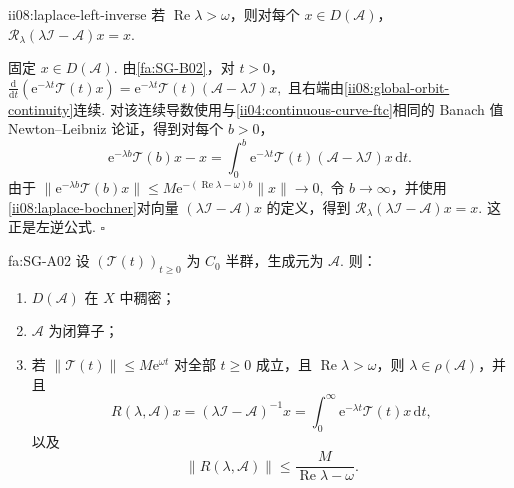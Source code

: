 \begin{FAProposition}{ii08:laplace-left-inverse}
若 \(\displaystyle\operatorname{Re}\lambda>\omega\)，则对每个 \(\displaystyle x\in D(\mathcal A)\)，
\(\displaystyle \mathcal R_\lambda(\lambda\mathcal I-\mathcal A)x=x.\)
\end{FAProposition}

\begin{FAProof}
固定 \(\displaystyle x\in D(\mathcal A)\). 由\autoref{fa:SG-B02}，对 \(\displaystyle t>0\)，
\(\displaystyle \frac{\mathrm{d}}{\mathrm{d}t} \left( \mathrm{e}^{-\lambda t}\mathcal T(t)x \right) = \mathrm{e}^{-\lambda t}\mathcal T(t)(\mathcal A-\lambda\mathcal I)x,\)
且右端由\autoref{ii08:global-orbit-continuity}连续. 对该连续导数使用与\autoref{ii04:continuous-curve-ftc}相同的 Banach 值 Newton--Leibniz 论证，得到对每个 \(\displaystyle b>0\)，
\[
\mathrm{e}^{-\lambda b}\mathcal T(b)x-x
=
\int_0^b
\mathrm{e}^{-\lambda t}\mathcal T(t)(\mathcal A-\lambda\mathcal I)x
\,\mathrm{d}t.
\]
由于
\(\displaystyle \|\mathrm{e}^{-\lambda b}\mathcal T(b)x\| \leqslant M\mathrm{e}^{-(\operatorname{Re}\lambda-\omega)b}\|x\| \longrightarrow0,\)
令 \(\displaystyle b\to\infty\)，并使用\autoref{ii08:laplace-bochner}对向量 \(\displaystyle(\lambda\mathcal I-\mathcal A)x\) 的定义，得到
\(\displaystyle \mathcal R_\lambda(\lambda\mathcal I-\mathcal A)x=x.\)
这正是左逆公式.
\hfill\(\square\)
\end{FAProof}

\begin{FATheorem}{fa:SG-A02}
设 \(\displaystyle(\mathcal T(t))_{t\geqslant0}\) 为 \(\displaystyle C_0\) 半群，生成元为 \(\displaystyle\mathcal A\). 则：
\begin{enumerate}[label=\textnormal{(\roman*)}]
\item \(\displaystyle D(\mathcal A)\) 在 \(\displaystyle X\) 中稠密；
\item \(\displaystyle\mathcal A\) 为闭算子；
\item 若 \(\displaystyle\|\mathcal T(t)\|\leqslant M\mathrm{e}^{\omega t}\) 对全部 \(\displaystyle t\geqslant0\) 成立，且 \(\displaystyle\operatorname{Re}\lambda>\omega\)，则 \(\displaystyle\lambda\in\rho(\mathcal A)\)，并且
\[
R(\lambda,\mathcal A)x
=
(\lambda\mathcal I-\mathcal A)^{-1}x
=
\int_0^\infty
\mathrm{e}^{-\lambda t}\mathcal T(t)x
\,\mathrm{d}t,
\]
以及
\[
\|R(\lambda,\mathcal A)\|
\leqslant
\frac{M}{\operatorname{Re}\lambda-\omega}.
\]
\end{enumerate}
\end{FATheorem}

